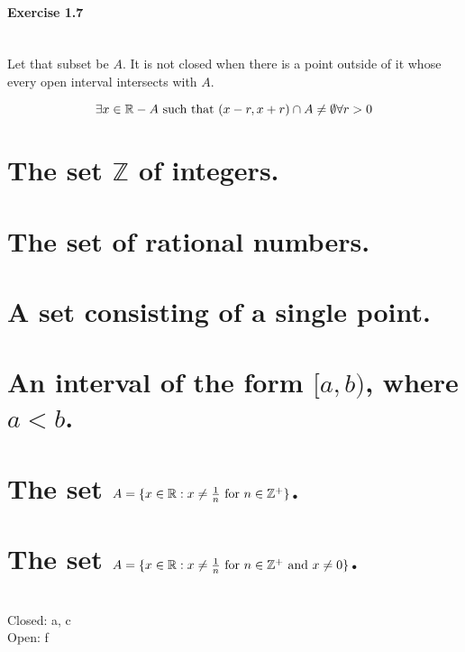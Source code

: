 \subsection{Exercise 1.7}


\begin{solution}
 \\Let that subset be $A$. It is not closed when there is a point outside of it whose every open interval intersects with $A$.
 
 $$\exists x \in \mathbb{R} - A \text{ such that } (x-r,x+r) \cap A \neq \emptyset \forall r > 0$$
\end{solution}


\begin{parts}
 
 \part{The set $\mathbb{Z}$ of integers.}
 \part{The set of rational numbers.}
 \part{A set consisting of a single point.}
 \part{An interval of the form $[a,b)$, where $a < b$.}
 \part{The set $A = \{x\in\mathbb{R}: x \neq \frac{1}{n} \text{ for } n \in \mathbb{Z}^+\}$.}
 \part{The set $A = \{x\in\mathbb{R}: x \neq \frac{1}{n} \text{ for } n \in \mathbb{Z}^+ \text{ and } x \neq 0\}$.}
 
 
\begin{solution}
 \\Closed: a, c \\
 Open: f
\end{solution}

\end{parts}

